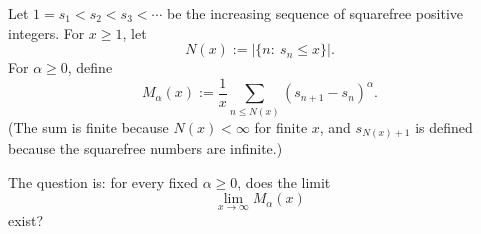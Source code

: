 Let $1=s_1<s_2<s_3<\cdots$ be the increasing sequence of squarefree positive integers.
For $x\ge 1$, let
\[
N(x):=|\{n:\ s_n\le x\}|.
\]
For $\alpha\ge 0$, define
\[
M_{\alpha}(x):=\frac{1}{x}\sum_{n\le N(x)}(s_{n+1}-s_n)^{\alpha}.
\]
(The sum is finite because $N(x)<\infty$ for finite $x$, and $s_{N(x)+1}$ is defined because the squarefree numbers are infinite.)

The question is: for every fixed $\alpha\ge 0$, does the limit
\[
\lim_{x\to\infty} M_{\alpha}(x)
\]
exist?
